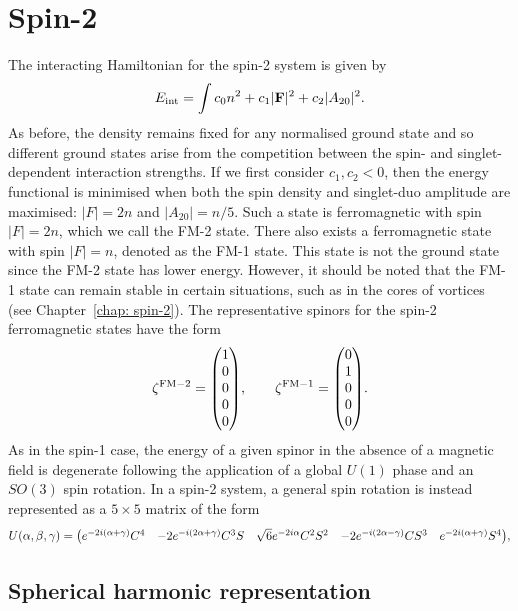 \section{Spin-2}
The interacting Hamiltonian for the spin-2 system is given by
\begin{equation}
    E_\mathrm{int} = \int c_0n^2 + c_1|\vb{F}|^2+c_2|A_{20}|^2.
\end{equation}
As before, the density remains fixed for any normalised ground state and so
different ground states arise from the competition between the spin-
and singlet-dependent interaction strengths.
If we first consider \(c_1, c_2 < 0\), then the energy functional is minimised
when both the spin density and singlet-duo amplitude are maximised: \(|F|=2n\)
and \(|A_{20}|=n/5\).
Such a state is ferromagnetic with spin \(|F|=2n\), which we call the FM-2
state.
There also exists a ferromagnetic state with spin \(|F|=n\), denoted as the FM-1
state.
This state is not the ground state since the FM-2 state has lower
energy.
However, it should be noted that the FM-1 state can remain stable in
certain situations, such as in the cores of vortices (see
Chapter~\ref{chap: spin-2}).
The representative spinors for the spin-2 ferromagnetic states have the form
\begin{equation}
    \zeta^\mathrm{FM-2} = \mqty(1 \\ 0 \\ 0 \\ 0 \\ 0), \qquad
    \zeta^\mathrm{FM-1} = \mqty(0 \\ 1 \\ 0 \\ 0 \\ 0).
\end{equation}
As in the spin-1 case, the energy of a given spinor in the absence of a magnetic
field is degenerate following the application of a global \(U(1)\) phase and an
\(SO(3)\) spin rotation.
In a spin-2 system, a general spin rotation is instead represented as a
\(5\times 5\) matrix of the form
\begin{equation}
    U(\alpha, \beta, \gamma) = \mqty(
        e^{-2i(\alpha + \gamma)}C^4 & -2e^{-i(2\alpha+\gamma)}C^3S 
        & \sqrt{6}e^{-2i\alpha}C^2S^2 & -2e^{-i(2\alpha-\gamma)}CS^3
        & e^{-2i(\alpha + \gamma)}S^4
    ),
\end{equation}

\subsection{Spherical harmonic representation}


